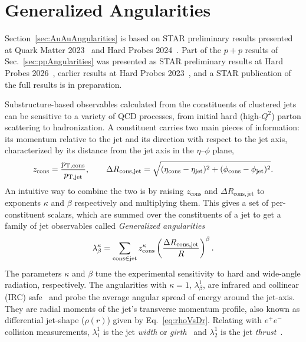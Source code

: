 \chapter{Generalized Angularities}
\label{ch:angularities}
\begin{itquote}
Section~\ref{sec:AuAuAngularities} is based on STAR preliminary results presented at Quark Matter 2023~\cite{Pani:2024mgy} and Hard Probes 2024~\cite{Pani:HP2024poster}.
%
Part of the \(p+p\) results of Sec.~\ref{sec:ppAngularities} was presented as STAR preliminary results at Hard Probes 2026~\cite{Pani:HP2026poster}, earlier results at Hard Probes 2023~\cite{Pani_2024}, and a STAR publication of the full results is in preparation.
\end{itquote}
Substructure-based observables calculated from the constituents of clustered jets can be sensitive to a variety of QCD processes, from initial hard (high-\(Q^2\)) parton scattering to hadronization.
%
A constituent carries two main pieces of information: its momentum relative to the jet and its direction with respect to the jet axis, characterized by its distance from the jet axis in the \(\eta\)--\(\phi\) plane,
\begin{equation}
	z_\mathrm{cons} = \frac{p_{\rm T, cons}}{p_{\rm T, jet}}, \qquad \Delta R_\mathrm{cons, jet}=\sqrt{(\eta_\mathrm{cons} - \eta_\mathrm{jet})^2 + (\phi_\mathrm{cons} - \phi_\mathrm{jet})^2}.
\end{equation}
%
An intuitive way to combine the two is by raising \(z_\mathrm{cons}\) and \(\Delta R_\mathrm{cons, jet}\) to exponents \(\kappa\) and \(\beta\) respectively and multiplying them. 
%
This gives a set of per-constituent scalars, which are summed over the constituents of a jet to get a family of jet observables called \emph{Generalized angularities}
%
\begin{equation}\label{eq:LambdaKappaBeta}
	\lambda_\beta^\kappa=\sum_{\mathrm{cons} \in \mathrm{jet}}z_{\rm cons}^\kappa \left(\frac{\Delta R_\mathrm{cons, jet}}{R}\right)^\beta.
\end{equation}
%
The parameters $\kappa$ and $\beta$ tune the experimental sensitivity to hard and wide-angle radiation, respectively. 
%
The angularities with \(\kappa = 1\), \(\lambda^1_\beta\), are infrared and collinear (IRC) safe~\cite{Berger_2003} and probe the average angular spread of energy around the jet-axis. 
%
They are radial moments of the  jet's transverse momentum profile, also known as differential jet-shape (\(\rho(r)\)) given by Eq.~\ref{eq:rhoVsDr}.
%
Relating with \(e^+e^-\) collision measurements, \(\lambda_1^1\) is the jet \emph{width} or \emph{girth}~\cite{CATANI1992269} and \(\lambda_2^1\) is the jet \emph{thrust}~\cite{Thrust_Larkoski_2014}. 
